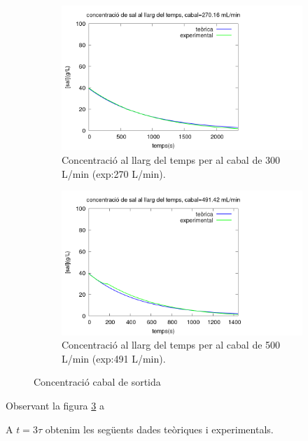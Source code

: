 \documentclass[10pt, twoside]{article}
\begin{document}
\begin{figure}[hbt!]
    \centering
    \begin{subfigure}{0.45\textwidth}
        \centering
        \includegraphics[width=\textwidth]{conc300.png}
        \caption{Concentració al llarg del temps per al cabal de 300 L/min (exp:270 L/min).}
        \label{fig:conc300}
    \end{subfigure}
    \hspace{0.025\textwidth}
    \begin{subfigure}{0.45\textwidth}
        \centering
        \includegraphics[width=\textwidth]{conc500.png}
        \caption{Concentració al llarg del temps per al cabal de 500 L/min (exp:491 L/min).}
        \label{fig:conc500}
    \end{subfigure}
    \caption{Concentració cabal de sortida}
    \label{fig:concs}
\end{figure}

Observant la figura \ref{fig:concs} a

A $t=3\tau$ obtenim les següents dades teòriques i experimentals.
\end{document}
